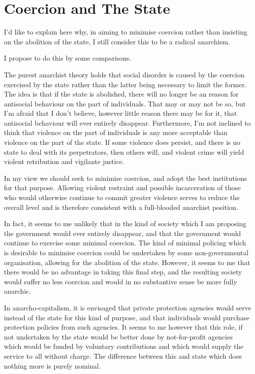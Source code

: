 \section{Coercion and The State}

I'd like to explain here why, in aiming to minimise coercion rather than insisting on the abolition of the state, I still consider this to be a radical anarchism.

I propose to do this by some comparisons.

The purest anarchist theory holds that social disorder is caused by the coercion exercised by the state rather than the latter being necessary to limit the former.
The idea is that if the state is abolished, there will no longer be an reason for antisocial behaviour on the part of individuals.
That may or may not be so, but I'm afraid that I don't believe, however little reason there may be for it, that antisocial behaviour will ever entirely disappear.
Furthermore, I'm not inclined to think that violence on the part of individuals is any more acceptable than violence on the part of the state.
If some violence does persist, and there is no state to deal with its perpetrators, then others will, and violent crime will yield violent retribution and vigilante justice.

In my view we should seek to minimise coercion, and adopt the best institutions for that purpose.
Allowing violent restraint and possible incarceration of those who would otherwise continue to commit greater violence serves to reduce the overall level and is therefore consistent with a full-blooded anarchist position.

In fact, it seems to me unlikely that in the kind of society which I am proposing the government would ever entirely disappear, and that the government would continue to exercise some minimal coercion.
The kind of minimal policing which is desirable to minimise coercion could be undertaken by some non-governmental organisation, allowing for the abolition of the state.
However, it seems to me that there would be no advantage in taking this final step, and the resulting society would suffer no less coercion and would in no substantive sense be more fully anarchic.

In  anarcho-capitalism, it is envisaged that private protection agencies would serve instead of the state for this kind of purpose, and that individuals would purchase protection policies from such agencies.
It seems to me however that this role, if not undertaken by the state would be better done by not-for-profit agencies which would be funded by voluntary contributions and which would supply the service to all without charge.
The difference between this and state which does nothing more is purely nominal.


